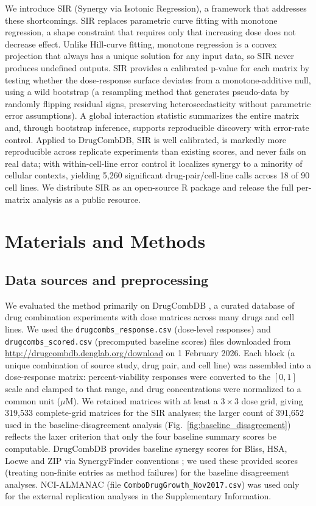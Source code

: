 \documentclass[unnumsec,webpdf,contemporary,large]{oup-authoring-template}
\begin{document}
We introduce SIR (Synergy via Isotonic Regression), a framework that addresses these shortcomings.
SIR replaces parametric curve fitting with monotone regression, a shape constraint that requires only that increasing dose does not decrease effect.
Unlike Hill-curve fitting, monotone regression is a convex projection that always has a unique solution for any input data, so SIR never produces undefined outputs.
SIR provides a calibrated p-value for each matrix by testing whether the dose-response surface deviates from a monotone-additive null, using a wild bootstrap \cite{Wu1986} (a resampling method that generates pseudo-data by randomly flipping residual signs, preserving heteroscedasticity without parametric error assumptions).
A global interaction statistic summarizes the entire matrix and, through bootstrap inference, supports reproducible discovery with error-rate control.
Applied to DrugCombDB, SIR is well calibrated, is markedly more reproducible across replicate experiments than existing scores, and never fails on real data; with within-cell-line error control it localizes synergy to a minority of cellular contexts, yielding 5{,}260 significant drug-pair/cell-line calls across 18 of 90 cell lines.
We distribute SIR as an open-source R package and release the full per-matrix analysis as a public resource.

\section{Materials and Methods}

\subsection{Data sources and preprocessing}
We evaluated the method primarily on DrugCombDB \cite{DrugCombDB2020}, a curated database of drug combination experiments with dose matrices across many drugs and cell lines.
We used the \texttt{drugcombs\_response.csv} (dose-level responses) and \texttt{drugcombs\_scored.csv} (precomputed baseline scores) files downloaded from \url{http://drugcombdb.denglab.org/download} on 1 February 2026.
Each block (a unique combination of source study, drug pair, and cell line) was assembled into a dose-response matrix: percent-viability responses were converted to the $[0,1]$ scale and clamped to that range, and drug concentrations were normalized to a common unit ($\mu$M).
We retained matrices with at least a $3\times 3$ dose grid, giving 319{,}533 complete-grid matrices for the SIR analyses; the larger count of 391{,}652 used in the baseline-disagreement analysis (Fig.~\ref{fig:baseline_disagreement}) reflects the laxer criterion that only the four baseline summary scores be computable.
DrugCombDB provides baseline synergy scores for Bliss, HSA, Loewe and ZIP via SynergyFinder conventions \cite{SynergyFinder2017}; we used these provided scores (treating non-finite entries as method failures) for the baseline disagreement analyses.
NCI-ALMANAC \cite{Holbeck2017} (file \texttt{ComboDrugGrowth\_Nov2017.csv}) was used only for the external replication analyses in the Supplementary Information.
\end{document}
